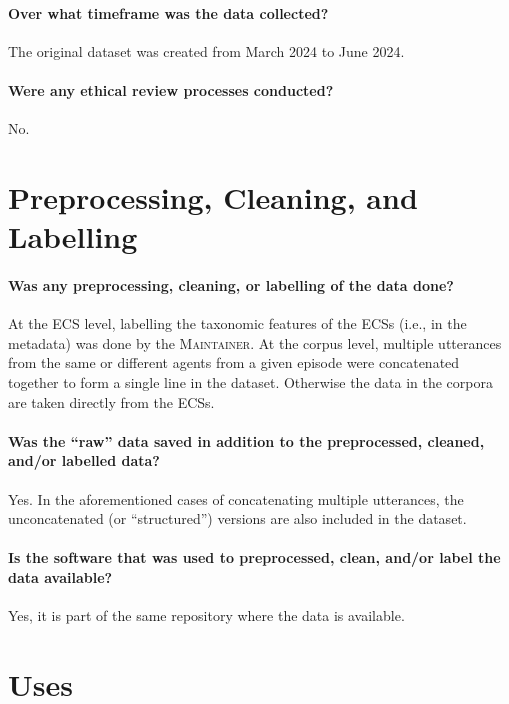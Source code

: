 \documentclass{article}
\newcommand\M{\textsc{Maintainer}}
\begin{document}
\paragraph{Over what timeframe was the data collected?}
The original dataset was created from March 2024 to June 2024.

\paragraph{Were any ethical review processes conducted?}
No.

\section{Preprocessing, Cleaning, and Labelling}
\paragraph{Was any preprocessing, cleaning, or labelling of the data done?}
At the ECS level, labelling the taxonomic features of the ECSs (i.e., in the metadata) was done by the \M{}.
At the corpus level, multiple utterances from the same or different agents from a given episode were concatenated together to form a single line in the dataset.
Otherwise the data in the corpora are taken directly from the ECSs.

\paragraph{Was the ``raw'' data saved in addition to the preprocessed, cleaned, and/or labelled data?}
Yes.
In the aforementioned cases of concatenating multiple utterances, the unconcatenated (or ``structured'') versions are also included in the dataset. 

\paragraph{Is the software that was used to preprocessed, clean, and/or label the data available?}
Yes, it is part of the same repository where the data is available.


\section{Uses}
\end{document}
